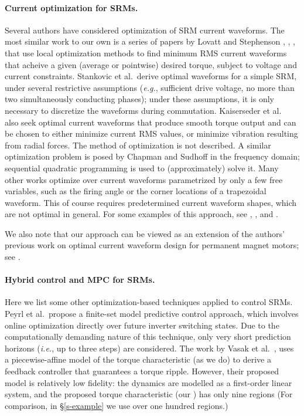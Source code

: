 \documentclass[11pt]{article}
\newcommand{\eg}{{\it e.g.}}
\newcommand{\ie}{{\it i.e.}}
\begin{document}
\paragraph{Current optimization for SRMs.}
Several authors have considered optimization of SRM current waveforms.
The most similar work to our own is 
a series of papers by Lovatt and Stephenson 
\cite{lovatt1994computer},
\cite{lovatt1997computer},
\cite{lovatt1997optimum},
that use local optimization methods to find minimum RMS current waveforms
that acheive a given (average or pointwise) desired torque,
subject to voltage and current constraints.
Stankovic et al.\
derive optimal waveforms for a simple SRM,
under several restrictive assumptions
(\eg, sufficient drive voltage, 
no more than two simultaneously conducting phases);
under these assumptions, it is only necessary to discretize the
waveforms during commutation.
Kaiserseder et al.\ \cite{kaiserseder2003current}
also seek optimal current waveforms that produce smooth torque
output and can be chosen to either minimize current RMS values,
or minimize vibration resulting from radial forces.
The method of optimization is not described.
A similar optimization problem is posed by Chapman and Sudhoff 
\cite{chapman2002design}
in the frequency domain;
sequential quadratic programming is used to (approximately) solve it.
Many other works optimize over current waveforms parametrized by only
a few free variables, 
such as the firing angle or the corner locations of a trapezoidal waveform.
This of course requires predetermined current waveform shapes,
which are not optimal in general.
For some examples of this approach, see 
\cite{mademlis2003performance}, \cite{le1993current}, and \cite{choi2002new}.

We also note that our approach can be viewed as an extension
of the authors' previous work on optimal current waveform design
for permanent magnet motors; see \cite{moehle2015optimal}.




\paragraph{Hybrid control and MPC for SRMs.}
Here we list some other optimization-based techniques 
applied to control SRMs.
Peyrl et al.\ propose a finite-set model predictive control approach,
which involves online optimization directly over future inverter switching states.
Due to the computationally demanding nature of this technique,
only very short prediction horizons (\ie, up to three steps) are considered.
The work by Vasak et al.\ \cite{vasak2007bounding},
uses a piecewise-affine model of the torque characteristic 
(as we do)
to derive a feedback controller that guarantees a torque ripple.
However, their proposed model is relatively low fidelity:
the dynamics are modelled as a first-order linear system,
and the proposed torque characteristic 
(our ) has only nine regions
(For comparison, in \S\ref{s-example} we use over one hundred regions.)
\end{document}
